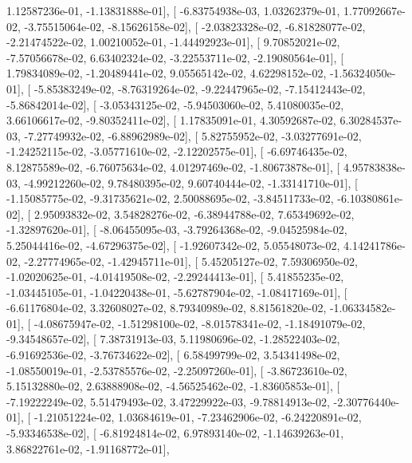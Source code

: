 \documentclass{article}
\begin{document}
          1.12587236e-01,  -1.13831888e-01],
       [ -6.83754938e-03,   1.03262379e-01,   1.77092667e-02,
         -3.75515064e-02,  -8.15626158e-02],
       [ -2.03823328e-02,  -6.81828077e-02,  -2.21474522e-02,
          1.00210052e-01,  -1.44492923e-01],
       [  9.70852021e-02,  -7.57056678e-02,   6.63402324e-02,
         -3.22553711e-02,  -2.19080564e-01],
       [  1.79834089e-02,  -1.20489441e-02,   9.05565142e-02,
          4.62298152e-02,  -1.56324050e-01],
       [ -5.85383249e-02,  -8.76319264e-02,  -9.22447965e-02,
         -7.15412443e-02,  -5.86842014e-02],
       [ -3.05343125e-02,  -5.94503060e-02,   5.41080035e-02,
          3.66106617e-02,  -9.80352411e-02],
       [  1.17835091e-01,   4.30592687e-02,   6.30284537e-03,
         -7.27749932e-02,  -6.88962989e-02],
       [  5.82755952e-02,  -3.03277691e-02,  -1.24252115e-02,
         -3.05771610e-02,  -2.12202575e-01],
       [ -6.69746435e-02,   8.12875589e-02,  -6.76075634e-02,
          4.01297469e-02,  -1.80673878e-01],
       [  4.95783838e-03,  -4.99212260e-02,   9.78480395e-02,
          9.60740444e-02,  -1.33141710e-01],
       [ -1.15085775e-02,  -9.31735621e-02,   2.50088695e-02,
         -3.84511733e-02,  -6.10380861e-02],
       [  2.95093832e-02,   3.54828276e-02,  -6.38944788e-02,
          7.65349692e-02,  -1.32897620e-01],
       [ -8.06455095e-03,  -3.79264368e-02,  -9.04525984e-02,
          5.25044416e-02,  -4.67296375e-02],
       [ -1.92607342e-02,   5.05548073e-02,   4.14241786e-02,
         -2.27774965e-02,  -1.42945711e-01],
       [  5.45205127e-02,   7.59306950e-02,  -1.02020625e-01,
         -4.01419508e-02,  -2.29244413e-01],
       [  5.41855235e-02,  -1.03445105e-01,  -1.04220438e-01,
         -5.62787904e-02,  -1.08417169e-01],
       [ -6.61176804e-02,   3.32608027e-02,   8.79340989e-02,
          8.81561820e-02,  -1.06334582e-01],
       [ -4.08675947e-02,  -1.51298100e-02,  -8.01578341e-02,
         -1.18491079e-02,  -9.34548657e-02],
       [  7.38731913e-03,   5.11980696e-02,  -1.28522403e-02,
         -6.91692536e-02,  -3.76734622e-02],
       [  6.58499799e-02,   3.54341498e-02,  -1.08550019e-01,
         -2.53785576e-02,  -2.25097260e-01],
       [ -3.86723610e-02,   5.15132880e-02,   2.63888908e-02,
         -4.56525462e-02,  -1.83605853e-01],
       [ -7.19222249e-02,   5.51479493e-02,   3.47229922e-03,
         -9.78814913e-02,  -2.30776440e-01],
       [ -1.21051224e-02,   1.03684619e-01,  -7.23462906e-02,
         -6.24220891e-02,  -5.93346538e-02],
       [ -6.81924814e-02,   6.97893140e-02,  -1.14639263e-01,
          3.86822761e-02,  -1.91168772e-01],
\end{document}
